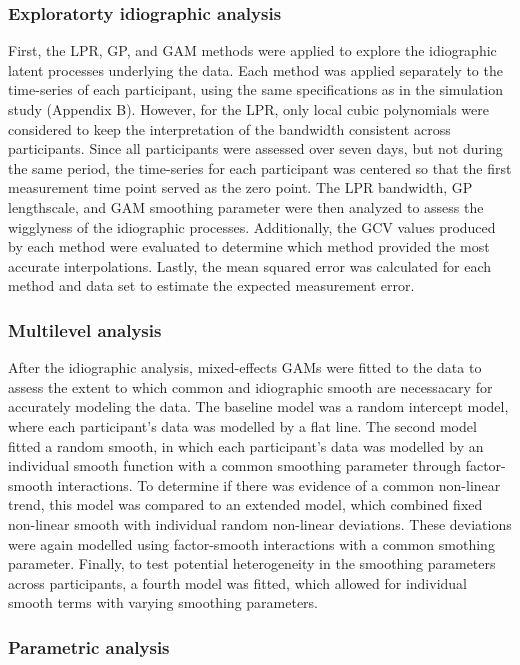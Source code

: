 \documentclass[man, floatsintext]{apa7}
\begin{document}
\subsubsection{Exploratorty idiographic analysis}

First, the LPR, GP, and GAM methods were applied to explore the idiographic
latent processes underlying the data. Each method was applied separately to the
time-series of each participant, using the same specifications as in the
simulation study (Appendix B). However, for the LPR, only local cubic
polynomials were
considered to keep the interpretation of the bandwidth consistent across
participants.
Since all participants were assessed over seven days, but not during the same
period, the time-series for each participant was centered so that the first
measurement time point served as the zero point. The LPR bandwidth, GP
lengthscale, and GAM smoothing parameter were then analyzed to assess the
wigglyness of the idiographic processes. Additionally, the GCV values produced
by each method were evaluated to determine which method provided the most
accurate interpolations. Lastly, the mean squared error was calculated for each
method and data set to estimate the expected measurement error.

\subsubsection{Multilevel analysis}

After the idiographic analysis, mixed-effects GAMs were fitted to the data to
assess the extent to which common and idiographic smooth are necessacary for
accurately modeling the data. The baseline model was a random intercept model,
where each participant's data was modelled by a flat line.
The second model fitted a random smooth, in which each participant's data
was modelled by an individual smooth function with a common smoothing parameter
through factor-smooth interactions. To determine if there was evidence of a
common non-linear trend, this model was compared to an extended model,
which combined fixed non-linear smooth with individual random non-linear
deviations. These deviations were again modelled using factor-smooth
interactions with a common smothing parameter. Finally, to test
potential heterogeneity in the smoothing parameters across participants,
a fourth model was fitted, which allowed for individual smooth terms with
varying smoothing parameters.

\subsubsection{Parametric analysis}
\end{document}
